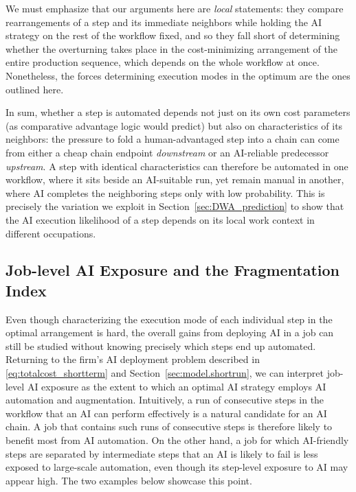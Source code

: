 We must emphasize that our arguments here are \emph{local} statements: they compare rearrangements of a step and its immediate neighbors while holding the AI strategy on the rest of the workflow fixed, and so they fall short of determining whether the overturning takes place in the cost-minimizing arrangement of the entire production sequence, which depends on the whole workflow at once.
Nonetheless, the forces determining execution modes in the optimum are the ones outlined here.

In sum, whether a step is automated depends not just on its own cost parameters (as comparative advantage logic would predict) but also on characteristics of its neighbors: the pressure to fold a human-advantaged step into a chain can come from either a cheap chain endpoint \emph{downstream} or an AI-reliable predecessor \emph{upstream}.
A step with identical characteristics can therefore be automated in one workflow, where it sits beside an AI-suitable run, yet remain manual in another, where AI completes the neighboring steps only with low probability.
This is precisely the variation we exploit in Section~\ref{sec:DWA_prediction} to show that the AI execution likelihood of a step depends on its local work context in different occupations.


\subsection{Job-level AI Exposure and the Fragmentation Index}
\label{sec:fragmentation}

Even though characterizing the execution mode of each individual step in the optimal arrangement is hard, the overall gains from deploying AI in a job can still be studied without knowing precisely which steps end up automated.
Returning to the firm's AI deployment problem described in \eqref{eq:totalcost_shortterm} and Section~\ref{sec:model.shortrun}, we can interpret job-level AI exposure as the extent to which an optimal AI strategy employs AI automation and augmentation.
Intuitively, a run of consecutive steps in the workflow that an AI can perform effectively is a natural candidate for an AI chain.
A job that contains such runs of consecutive steps is therefore likely to benefit most from AI automation.
On the other hand, a job for which AI-friendly steps are separated by intermediate steps that an AI is likely to fail is less exposed to large-scale automation, even though its step-level exposure to AI may appear high. 
The two examples below showcase this point.

